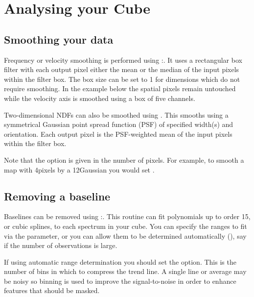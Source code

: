 \documentclass[11pt,oneside,chapters]{starlink}
\providecommand{\mfittrend}{\xref{\task{mfittrend}}{sun95}{MFITTREND}}
\begin{document}
\chapter{Analysing your Cube}
\label{sec:analyse}

\section{Smoothing your data}

Frequency or velocity smoothing is performed using \Kappa:\block. It
uses a rectangular box filter with each output pixel either the mean
or the median of the input pixels within the filter box. The box size
can be set to 1 for dimensions which do not require smoothing. In the
example below the spatial pixels remain untouched while the velocity
axis is smoothed using a box of five channels.
\begin{terminalv}
\end{terminalv}

Two-dimensional NDFs can also be smoothed using \gausmooth. This
smooths using a symmetrical Gaussian point spread function (PSF) of
specified width(s) and orientation. Each output pixel is the
PSF-weighted mean of the input pixels within the filter box.

\begin{terminalv}
\end{terminalv}
Note that the  option is given in the number of pixels.
For example, to smooth a map with 4\arcsec pixels by a 12\arcsec Gaussian
you would set .

\section{Removing a baseline}

Baselines can be removed using \Kappa:\mfittrend. This routine can
fit polynomials up to order 15, or cubic splines, to each spectrum in
your cube. You can specify the ranges to fit via the 
parameter, or you can allow them to be determined automatically
(), say if the number of observations is large.

\begin{terminalv}
\end{terminalv}

If using automatic range determination you should set the
 option. This is the number of bins in which to compress
the trend line. A single line or average may be noisy so binning is
used to improve the signal-to-noise in order to enhance features that
should be masked.
\end{document}

